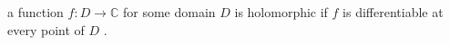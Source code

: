  a function  $ f : D \to  \mathbb{C} $  for some domain  $ D $  is holomorphic
if  $ f $  is differentiable at every point of  $ D $ .


